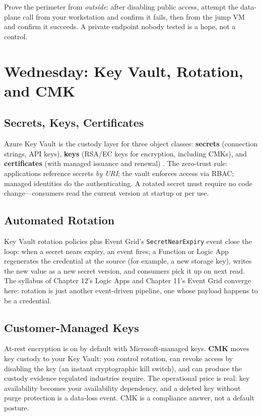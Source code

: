 \begin{tipbox}
Prove the perimeter from \emph{outside}: after disabling public access, attempt the data-plane call from your workstation and confirm it fails, then from the jump VM and confirm it succeeds. A private endpoint nobody tested is a hope, not a control.
\end{tipbox}

\section{Wednesday: Key Vault, Rotation, and CMK}

\subsection{Secrets, Keys, Certificates}
Azure Key Vault is the custody layer for three object classes: \textbf{secrets} (connection strings, API keys), \textbf{keys} (RSA/EC keys for encryption, including CMKs), and \textbf{certificates} (with managed issuance and renewal) \cite{microsoft2025keyVault}. The zero-trust rule: applications reference secrets \emph{by URI}; the vault enforces access via RBAC; managed identities do the authenticating. A rotated secret must require no code change---consumers read the current version at startup or per use.

\subsection{Automated Rotation}
Key Vault rotation policies plus Event Grid's \texttt{SecretNearExpiry} event close the loop: when a secret nears expiry, an event fires; a Function or Logic App regenerates the credential at the source (for example, a new storage key), writes the new value as a new secret version, and consumers pick it up on next read. The syllabus of Chapter 12's Logic Apps and Chapter 11's Event Grid converge here: rotation is just another event-driven pipeline, one whose payload happens to be a credential.

\subsection{Customer-Managed Keys}
At-rest encryption is on by default with Microsoft-managed keys. \textbf{CMK} moves key custody to your Key Vault: you control rotation, can revoke access by disabling the key (an instant cryptographic kill switch), and can produce the custody evidence regulated industries require. The operational price is real: key availability becomes your availability dependency, and a deleted key without purge protection is a data-loss event. CMK is a compliance answer, not a default posture.


